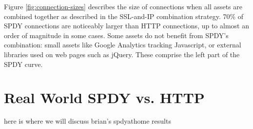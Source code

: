 \documentclass[11pt,letterpaper,notitlepage]{article}
\begin{document}
Figure \ref{fig:connection-sizes} describes the size of connections when all
assets are combined together as described in the SSL-and-IP combination
strategy. 70\% of SPDY connections are noticeably larger than HTTP connections,
up to almost an order of magnitude in some cases. Some assets do not benefit
from SPDY's combination: small assets like Google Analytics tracking
Javascript, or external libraries used on web pages such as jQuery. These
comprise the left part of the SPDY curve.


\section{Real World SPDY vs. HTTP}
\label{sec:realworld}
here is where we will discuss brian's spdyathome results


%



\end{document}
